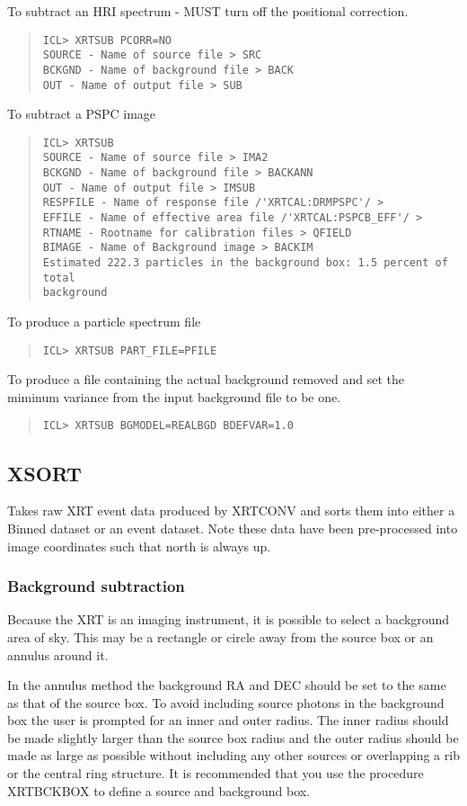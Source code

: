 \documentclass{book}
\renewcommand{\_}{{\tt\char'137}}     %
\begin{document}
To subtract an HRI spectrum - MUST turn off the positional correction.
\begin{quote}\begin{verbatim}
ICL> XRTSUB PCORR=NO
SOURCE - Name of source file > SRC
BCKGND - Name of background file > BACK
OUT - Name of output file > SUB
\end{verbatim}\end{quote}
To subtract a PSPC image
\begin{quote}\begin{verbatim}
ICL> XRTSUB
SOURCE - Name of source file > IMA2
BCKGND - Name of background file > BACKANN
OUT - Name of output file > IMSUB
RESPFILE - Name of response file /'XRTCAL:DRMPSPC'/ >
EFFILE - Name of effective area file /'XRTCAL:PSPCB_EFF'/ >
RTNAME - Rootname for calibration files > QFIELD
BIMAGE - Name of Background image > BACKIM
Estimated 222.3 particles in the background box: 1.5 percent of total
background
\end{verbatim}\end{quote}
To produce a particle spectrum file
\begin{quote}\begin{verbatim}
ICL> XRTSUB PART_FILE=PFILE
\end{verbatim}\end{quote}
To produce a file containing the actual background removed and
set the miminum variance from the input background file to be
one.
\begin{quote}\begin{verbatim}
ICL> XRTSUB BGMODEL=REALBGD BDEFVAR=1.0
\end{verbatim}\end{quote}
\subsection{XSORT}
Takes raw XRT event data produced by XRTCONV and sorts them into either
a Binned dataset or an event dataset.
Note these data have been pre-processed into image coordinates
such that north is always up.

\subsubsection{Background subtraction}
Because the XRT is an imaging instrument, it is possible to select
a background area of sky. This may be a rectangle or circle away from
the source box or an annulus around it.

In the annulus method the background RA and DEC should be set to
the same as that of the source box. To avoid including source photons
in the background box the user is prompted for an inner and outer
radius. The inner radius should be made slightly larger than the
source box radius and the outer radius should be made as large as
possible without including any other sources or overlapping a rib
or the central ring structure. It is recommended that you use the
procedure XRTBCKBOX to define a source and background box.
\end{document}
